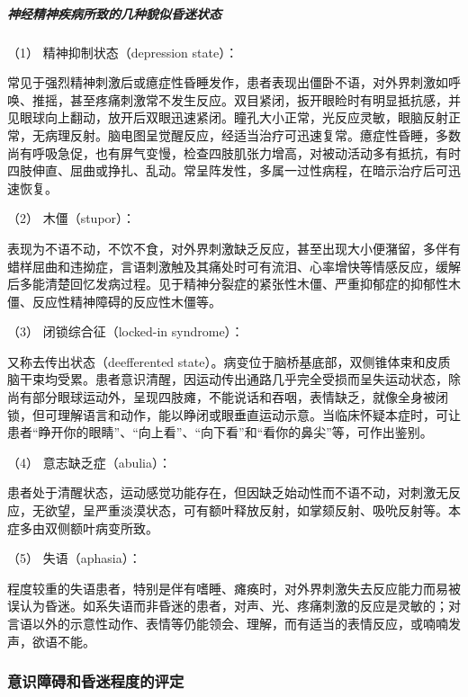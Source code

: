 \subparagraph{神经精神疾病所致的几种貌似昏迷状态}

\hypertarget{text00010.htmlux5cux23CHP1-2-2-2-2-1}{}
（1） 精神抑制状态（depression state）：

常见于强烈精神刺激后或癔症性昏睡发作，患者表现出僵卧不语，对外界刺激如呼唤、推摇，甚至疼痛刺激常不发生反应。双目紧闭，扳开眼睑时有明显抵抗感，并见眼球向上翻动，放开后双眼迅速紧闭。瞳孔大小正常，光反应灵敏，眼脑反射正常，无病理反射。脑电图呈觉醒反应，经适当治疗可迅速复常。癔症性昏睡，多数尚有呼吸急促，也有屏气变慢，检查四肢肌张力增高，对被动活动多有抵抗，有时四肢伸直、屈曲或挣扎、乱动。常呈阵发性，多属一过性病程，在暗示治疗后可迅速恢复。

\hypertarget{text00010.htmlux5cux23CHP1-2-2-2-2-2}{}
（2） 木僵（stupor）：

表现为不语不动，不饮不食，对外界刺激缺乏反应，甚至出现大小便潴留，多伴有蜡样屈曲和违拗症，言语刺激触及其痛处时可有流泪、心率增快等情感反应，缓解后多能清楚回忆发病过程。见于精神分裂症的紧张性木僵、严重抑郁症的抑郁性木僵、反应性精神障碍的反应性木僵等。

\hypertarget{text00010.htmlux5cux23CHP1-2-2-2-2-3}{}
（3） 闭锁综合征（locked-in syndrome）：

又称去传出状态（deefferented
state）。病变位于脑桥基底部，双侧锥体束和皮质脑干束均受累。患者意识清醒，因运动传出通路几乎完全受损而呈失运动状态，除尚有部分眼球运动外，呈现四肢瘫，不能说话和吞咽，表情缺乏，就像全身被闭锁，但可理解语言和动作，能以睁闭或眼垂直运动示意。当临床怀疑本症时，可让患者“睁开你的眼睛”、“向上看”、“向下看”和“看你的鼻尖”等，可作出鉴别。

\hypertarget{text00010.htmlux5cux23CHP1-2-2-2-2-4}{}
（4） 意志缺乏症（abulia）：

患者处于清醒状态，运动感觉功能存在，但因缺乏始动性而不语不动，对刺激无反应，无欲望，呈严重淡漠状态，可有额叶释放反射，如掌颏反射、吸吮反射等。本症多由双侧额叶病变所致。

\hypertarget{text00010.htmlux5cux23CHP1-2-2-2-2-5}{}
（5） 失语（aphasia）：

程度较重的失语患者，特别是伴有嗜睡、瘫痪时，对外界刺激失去反应能力而易被误认为昏迷。如系失语而非昏迷的患者，对声、光、疼痛刺激的反应是灵敏的；对言语以外的示意性动作、表情等仍能领会、理解，而有适当的表情反应，或喃喃发声，欲语不能。

\subsubsection{意识障碍和昏迷程度的评定}

